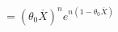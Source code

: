 \documentclass[preview]{standalone}
\begin{document}
\begin{align*}
= (\theta_0 \overline{X})^n e^{n(1-\theta_0 \overline{X})}
\end{align*}
\end{document}
